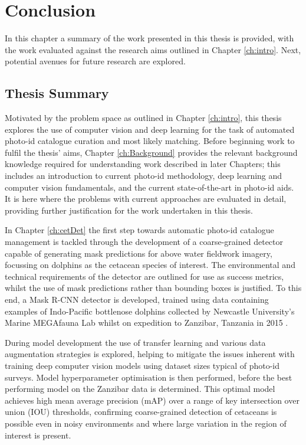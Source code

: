 \chapter{Conclusion}\label{ch:Conclusion}

In this chapter a summary of the work presented in this thesis is provided, with the work evaluated against the research aims outlined in Chapter \ref{ch:intro}. Next, potential avenues for future research are explored. 

\section{Thesis Summary}\label{ch:Conclusion,sec:Summary}

Motivated by the problem space as outlined in Chapter \ref{ch:intro}, this thesis explores the use of computer vision and deep learning for the task of automated photo-id catalogue curation and most likely matching. Before beginning work to fulfil the thesis' aims, Chapter \ref{ch:Background} provides the relevant background knowledge required for understanding work described in later Chapters; this includes an introduction to current photo-id methodology, deep learning and computer vision fundamentals, and the current state-of-the-art in photo-id aids. It is here where the problems with current approaches are evaluated in detail, providing further justification for the work undertaken in this thesis. 

In Chapter \ref{ch:cetDet} the first step towards automatic photo-id catalogue management is tackled through the development of a coarse-grained detector capable of generating mask predictions for above water fieldwork imagery, focussing on dolphins as the cetacean species of interest. The environmental and technical requirements of the detector are outlined for use as success metrics, whilst the use of mask predictions rather than bounding boxes is justified. To this end, a Mask R-CNN \cite{he_mask_2017} detector is developed, trained using data  containing examples of Indo-Pacific bottlenose dolphins collected by Newcastle University's Marine MEGAfauna Lab whilst on expedition to Zanzibar, Tanzania in 2015 \cite{sharpe_indian_2019}. 

During model development the use of transfer learning and various data augmentation strategies is explored, helping to mitigate the issues inherent with training deep computer vision models using dataset sizes typical of photo-id surveys. Model hyperparameter optimisation is then performed, before the best performing model on the Zanzibar data is determined. This optimal model achieves high mean average precision (mAP) over a range of key intersection over union (IOU) thresholds, confirming coarse-grained detection of cetaceans is possible even in noisy environments and where large variation in the region of interest is present. 

